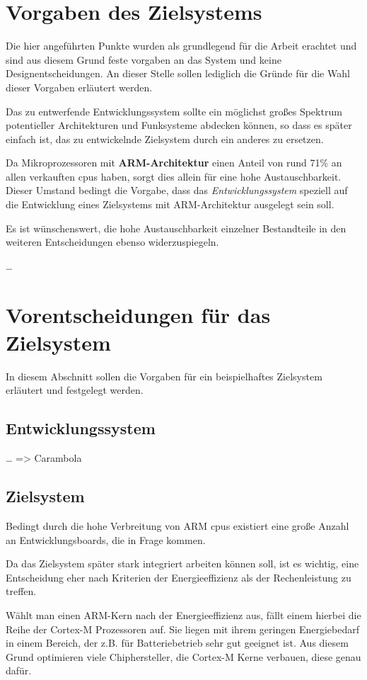 \section{Vorgaben des Zielsystems}
Die hier angeführten Punkte wurden als grundlegend für die Arbeit erachtet und
sind aus diesem Grund feste vorgaben an das System und keine
Designentscheidungen. An dieser Stelle sollen lediglich die Gründe für
die Wahl dieser Vorgaben erläutert werden.

Das zu entwerfende Entwicklungssystem sollte ein möglichst
großes Spektrum potentieller Architekturen und Funksysteme abdecken können, so
dass es später einfach ist, das zu entwickelnde Zielsystem durch ein anderes zu
ersetzen.

Da Mikroprozessoren mit \textbf{ARM-Architektur} einen Anteil von rund
71\%\cite{IDC01} an allen verkauften \glspl{cpu} haben, sorgt dies allein für
eine hohe Austauschbarkeit. Dieser Umstand bedingt die Vorgabe, dass das
\emph{Entwicklungssystem} speziell auf die Entwicklung eines Zielsystems
mit ARM-Architektur ausgelegt sein soll. 

Es ist wünschenswert, die hohe Austauschbarkeit einzelner Bestandteile in
den weiteren Entscheidungen ebenso widerzuspiegeln.

\ldots

\section{Vorentscheidungen für das  Zielsystem} In diesem Abschnitt sollen die
Vorgaben für ein beispielhaftes Zielsystem erläutert und festgelegt werden. 
\subsection{Entwicklungssystem}

\ldots
=> Carambola
\subsection{Zielsystem}
Bedingt durch die hohe Verbreitung von ARM \glspl{cpu}
existiert eine große Anzahl an Entwicklungsboards, die in Frage kommen.

Da das Zielsystem später stark integriert arbeiten können soll, ist es wichtig,
eine Entscheidung eher nach Kriterien der Energieeffizienz als der
Rechenleistung zu treffen.

Wählt man einen ARM-Kern nach der Energieeffizienz aus, fällt einem hierbei die
Reihe der Cortex-M Prozessoren auf. Sie liegen mit ihrem geringen Energiebedarf
in einem Bereich, der z.B. für Batteriebetrieb sehr gut geeignet ist. Aus diesem
Grund optimieren viele Chiphersteller, die Cortex-M Kerne verbauen, diese genau
dafür.

